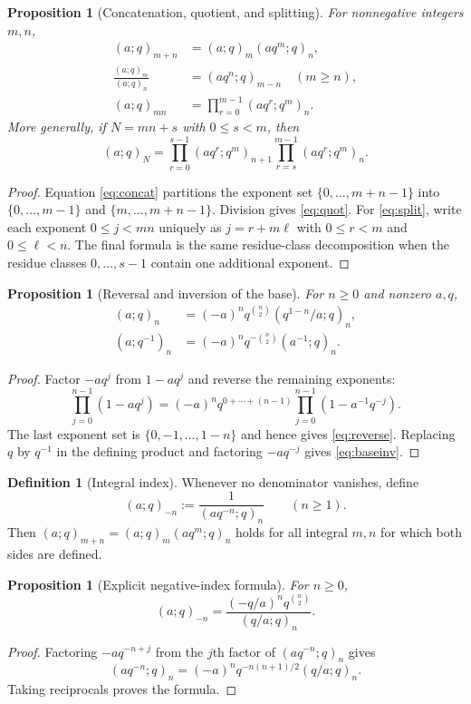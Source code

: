 \documentclass[11pt]{article}
\numberwithin{equation}{section}
\newtheorem{proposition}[theorem]{Proposition}
\theoremstyle{definition}
\newtheorem{definition}[theorem]{Definition}
\begin{document}
\begin{proposition}[Concatenation, quotient, and splitting]
For nonnegative integers $m,n$,
\begin{align}
(a;q)_{m+n}&=(a;q)_m(aq^m;q)_n,\label{eq:concat}\\
\frac{(a;q)_m}{(a;q)_n}&=(aq^n;q)_{m-n}\quad(m\ge n),\label{eq:quot}\\
(a;q)_{mn}&=\prod_{r=0}^{m-1}(aq^r;q^m)_n.\label{eq:split}
\end{align}
More generally, if $N=mn+s$ with $0\le s<m$, then
\[
(a;q)_N=\prod_{r=0}^{s-1}(aq^r;q^m)_{n+1}
       \prod_{r=s}^{m-1}(aq^r;q^m)_n.
\]
\end{proposition}
\begin{proof}
Equation \eqref{eq:concat} partitions the exponent set $\{0,\ldots,m+n-1\}$ into $\{0,\ldots,m-1\}$ and $\{m,\ldots,m+n-1\}$.  Division gives \eqref{eq:quot}.  For \eqref{eq:split}, write each exponent $0\le j<mn$ uniquely as $j=r+m\ell$ with $0\le r<m$ and $0\le\ell<n$.  The final formula is the same residue-class decomposition when the residue classes $0,\ldots,s-1$ contain one additional exponent.
\end{proof}

\begin{proposition}[Reversal and inversion of the base]
For $n\ge0$ and nonzero $a,q$,
\begin{align}
(a;q)_n&=(-a)^nq^{\binom n2}(q^{1-n}/a;q)_n,\label{eq:reverse}\\
(a;q^{-1})_n&=(-a)^nq^{-\binom n2}(a^{-1};q)_n.\label{eq:baseinv}
\end{align}
\end{proposition}
\begin{proof}
Factor $-aq^j$ from $1-aq^j$ and reverse the remaining exponents:
\[
\prod_{j=0}^{n-1}(1-aq^j)
=(-a)^nq^{0+\cdots+(n-1)}
 \prod_{j=0}^{n-1}(1-a^{-1}q^{-j}).
\]
The last exponent set is $\{0,-1,\ldots,1-n\}$ and hence gives \eqref{eq:reverse}.  Replacing $q$ by $q^{-1}$ in the defining product and factoring $-aq^{-j}$ gives \eqref{eq:baseinv}.
\end{proof}

\begin{definition}[Integral index]
Whenever no denominator vanishes, define
\[
(a;q)_{-n}:=\frac1{(aq^{-n};q)_n}\qquad(n\ge1).
\]
Then $(a;q)_{m+n}=(a;q)_m(aq^m;q)_n$ holds for all integral $m,n$ for which both sides are defined.
\end{definition}

\begin{proposition}[Explicit negative-index formula]
For $n\ge0$,
\[
(a;q)_{-n}=\frac{(-q/a)^nq^{\binom n2}}{(q/a;q)_n}.
\]
\end{proposition}
\begin{proof}
Factoring $-aq^{-n+j}$ from the $j$th factor of $(aq^{-n};q)_n$ gives
\[
(aq^{-n};q)_n=(-a)^nq^{-n(n+1)/2}(q/a;q)_n.
\]
Taking reciprocals proves the formula.
\end{proof}
\end{document}
